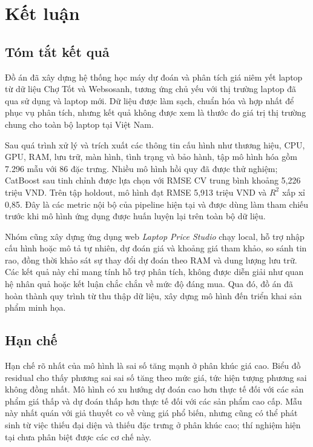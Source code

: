 \section{Kết luận}
\label{sec:conclusion}

\subsection{Tóm tắt kết quả}

Đồ án đã xây dựng hệ thống học máy dự đoán và phân tích giá niêm yết laptop từ dữ liệu Chợ Tốt và Websosanh, tương ứng chủ yếu với thị trường laptop đã qua sử dụng và laptop mới. Dữ liệu được làm sạch, chuẩn hóa và hợp nhất để phục vụ phân tích, nhưng kết quả không được xem là thước đo giá trị thị trường chung cho toàn bộ laptop tại Việt Nam.

Sau quá trình xử lý và trích xuất các thông tin cấu hình như thương hiệu, CPU, GPU, RAM, lưu trữ, màn hình, tình trạng và bảo hành, tập mô hình hóa gồm 7.296 mẫu với 86 đặc trưng. Nhiều mô hình hồi quy đã được thử nghiệm; CatBoost sau tinh chỉnh được lựa chọn với RMSE CV trung bình khoảng 5,226 triệu VND. Trên tập holdout, mô hình đạt RMSE 5,913 triệu VND và $R^2$ xấp xỉ 0,85. Đây là các metric nội bộ của pipeline hiện tại và được dùng làm tham chiếu trước khi mô hình ứng dụng được huấn luyện lại trên toàn bộ dữ liệu.

Nhóm cũng xây dựng ứng dụng web \textit{Laptop Price Studio} chạy local, hỗ trợ nhập cấu hình hoặc mô tả tự nhiên, dự đoán giá và khoảng giá tham khảo, so sánh tin rao, đồng thời khảo sát sự thay đổi dự đoán theo RAM và dung lượng lưu trữ. Các kết quả này chỉ mang tính hỗ trợ phân tích, không được diễn giải như quan hệ nhân quả hoặc kết luận chắc chắn về mức độ đáng mua. Qua đó, đồ án đã hoàn thành quy trình từ thu thập dữ liệu, xây dựng mô hình đến triển khai sản phẩm minh họa.

\subsection{Hạn chế}

Hạn chế rõ nhất của mô hình là sai số tăng mạnh ở phân khúc giá cao. Biểu đồ residual cho thấy phương sai sai số tăng theo mức giá, tức hiện tượng phương sai không đồng nhất. Mô hình có xu hướng dự đoán cao hơn thực tế đối với các sản phẩm giá thấp và dự đoán thấp hơn thực tế đối với các sản phẩm cao cấp. Mẫu này nhất quán với giả thuyết co về vùng giá phổ biến, nhưng cũng có thể phát sinh từ việc thiếu đại diện và thiếu đặc trưng ở phân khúc cao; thí nghiệm hiện tại chưa phân biệt được các cơ chế này.

